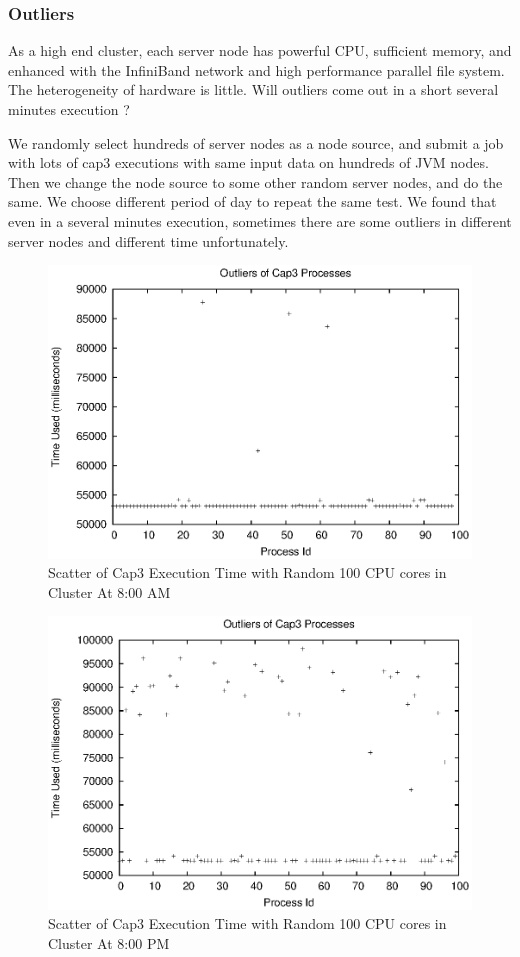 \subsubsection{Outliers}
As a high end cluster, each server node has powerful CPU, sufficient memory, and enhanced with the InfiniBand network and high performance parallel file system. The heterogeneity of hardware is little. Will outliers come out in a short several minutes execution ?

We randomly select hundreds of server nodes as a node source, and submit a job with lots of cap3 executions with same input data on hundreds of JVM nodes. Then we change the node source to some other random server nodes, and do the same. We choose different period of day to repeat the same test. We found that even in a several minutes execution, sometimes there are some outliers in different server nodes and different time unfortunately.

\begin{figure}
\centering
\includegraphics[width=0.9\columnwidth]{figures/outliers.eps}
\caption{Scatter of Cap3 Execution Time with Random 100 CPU cores in Cluster At 8:00 AM}
\label{figure:outlier}
\end{figure}

\begin{figure}
\centering
\includegraphics[width=0.9\columnwidth]{figures/yaoutliers.eps}
\caption{Scatter of Cap3 Execution Time with Random 100 CPU cores in Cluster At 8:00 PM}
\label{figure:yaoutlier}
\end{figure}

